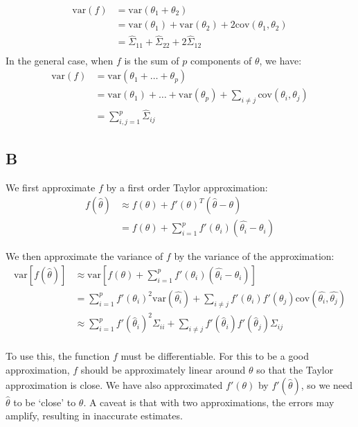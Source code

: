 \documentclass{article}
\begin{document}
\begin{align*}
\mbox{var}(f) &= \mbox{var}(\theta_1 + \theta_2)\\
&= \mbox{var}(\theta_1) + \mbox{var}(\theta_2) + 2\mbox{cov}(\theta_1, \theta_2)\\
&= \hat{\Sigma}_{11} + \hat{\Sigma}_{22} + 2\hat{\Sigma}_{12}\\
\end{align*}
In the general case, when \(f\) is the sum of \(p\) components of \(\theta\), we have:
\begin{align*}
\mbox{var}(f) &= \mbox{var}(\theta_1 + \ldots + \theta_p)\\
&= \mbox{var}(\theta_1) + \dots + \mbox{var}(\theta_p) + \sum_{i\neq j}\mbox{cov}(\theta_i, \theta_j)\\
&= \sum_{i,j = 1}^p \hat{\Sigma}_{ij}
\end{align*}


\subsection*{B}
We first approximate \(f\) by a first order Taylor approximation:
\begin{align*}
f(\hat{\theta}) &\approx f(\theta) + f'(\theta)^T(\hat{\theta} - \theta)\\
&= f(\theta) + \sum_{i=1}^p f'(\theta_i) (\hat{\theta_i} - \theta_i)
\end{align*}

We then approximate the variance of \(f\) by the variance of the approximation:
\begin{align*}
\mbox{var}[f(\hat{\theta})] &\approx \mbox{var}[ f(\theta) + \sum_{i=1}^p f'(\theta_i) (\hat{\theta_i} - \theta_i)]\\
&= \sum_{i=1}^p f'(\theta_i)^2 \mbox{var}(\hat{\theta_i}) + \sum_{i\neq j} f'(\theta_i) f'(\theta_j) \mbox{cov}(\hat{\theta_i}, \hat{\theta_j})\\
&\approx \sum_{i=1}^p f'(\hat{\theta}_i)^2 \Sigma_{ii} + \sum_{i\neq j} f'(\hat{\theta}_i) f'(\hat{\theta}_j) \Sigma_{ij}\\
\end{align*}

To use this, the function \(f\) must be differentiable. For this to be a good approximation, \(f\) should be approximately linear around \(\theta\) so that the Taylor approximation is close. We have also approximated \(f'(\theta)\) by \(f'(\hat{\theta})\), so we need \(\hat{\theta}\) to be `close' to \(\theta\). A caveat is that with two approximations, the errors may amplify, resulting in inaccurate estimates.
 
\end{document}

